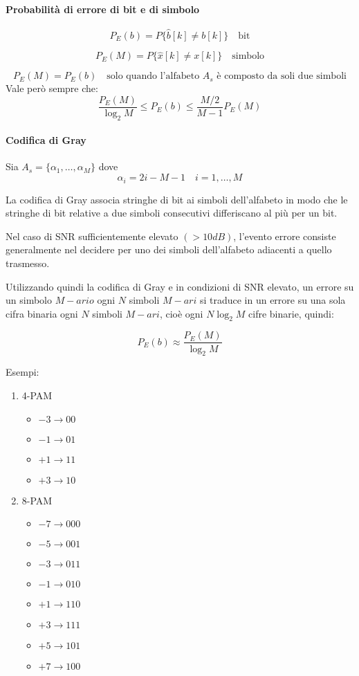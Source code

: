 \documentclass{article}
\begin{document}
\paragraph{Probabilità di errore di bit e di simbolo}

\[
P_E(b) = P\{\hat{b}[k] \neq b[k]\} \quad \text{bit}
\]

\[
P_E(M) = P\{\hat{x}[k] \neq x[k]\} \quad \text{simbolo}
\]

\[
P_E(M) = P_E(b) \quad \text{solo quando l'alfabeto } A_s \text{ è composto da soli due simboli}
\]
Vale però sempre che:
\[
\frac{P_E(M)}{\log_2 M} \leq P_E(b) \leq \frac{M/2}{M-1} P_E(M)
\]

\paragraph{Codifica di Gray}

Sia \( A_s = \{\alpha_1, \ldots, \alpha_M\} \) dove
\[ 
\alpha_i = 2i - M - 1 \quad i = 1, \ldots, M
\]

La codifica di Gray associa stringhe di bit ai simboli dell'alfabeto in modo che le stringhe di bit relative a due simboli consecutivi differiscano al più per un bit.

Nel caso di SNR sufficientemente elevato \( (> 10 dB) \), l'evento errore consiste generalmente nel decidere per uno dei simboli dell'alfabeto adiacenti a quello trasmesso.

Utilizzando quindi la codifica di Gray e in condizioni di SNR elevato, un errore su un simbolo \( M-ario \) ogni \( N \) simboli  \( M-ari \) si traduce in un errore su una sola cifra binaria ogni \( N \) simboli \( M-ari \), cioè ogni \( N \log_2 M \) cifre binarie, quindi:

\[
P_E(b) \approx \frac{P_E(M)}{\log_2 M}
\]


Esempi:

\begin{enumerate}
    \item 4-PAM
    \begin{itemize}
        \item $-3 \rightarrow 00$
        \item $-1 \rightarrow 01$
        \item $+1 \rightarrow 11$
        \item $+3 \rightarrow 10$
    \end{itemize}

    \item 8-PAM
    \begin{itemize}
        \item $-7 \rightarrow 000$
        \item $-5 \rightarrow 001$
        \item $-3 \rightarrow 011$
        \item $-1 \rightarrow 010$
        \item $+1 \rightarrow 110$
        \item $+3 \rightarrow 111$
        \item $+5 \rightarrow 101$
        \item $+7 \rightarrow 100$
    \end{itemize}
\end{enumerate}
\end{document}
